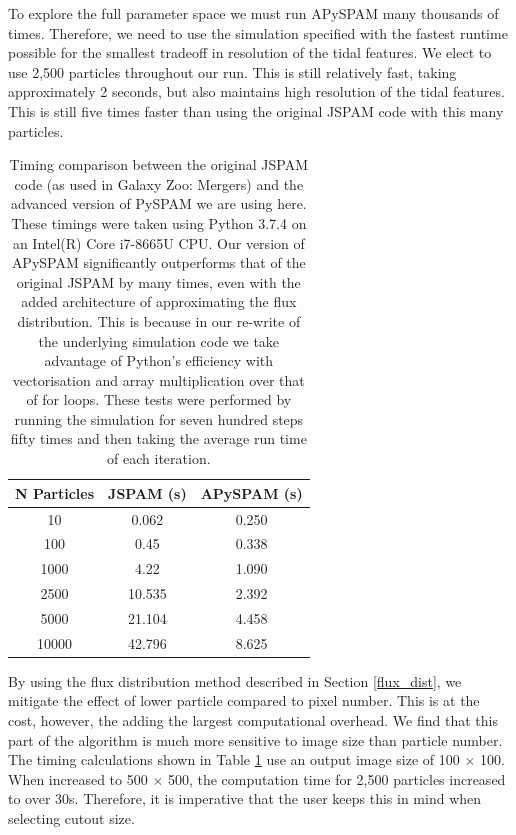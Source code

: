 To explore the full parameter space we must run APySPAM many thousands of times. Therefore, we need to use the simulation specified with the fastest runtime possible for the smallest tradeoff in resolution of the tidal features. We elect to use 2,500 particles throughout our run. This is still relatively fast, taking approximately 2 seconds, but also maintains high resolution of the tidal features. This is still five times faster than using the original JSPAM code with this many particles. 

\begin{table}
    \centering
    \begin{tabular}{|c|c|c|}
    \hline
        N Particles & JSPAM (s) & APySPAM (s)  \\
        \hline
        10 & 0.062 & 0.250 \\
        100 & 0.45 &  0.338 \\
        1000 & 4.22 & 1.090 \\
        2500 & 10.535 & 2.392 \\
        5000 & 21.104 & 4.458 \\
        10000 & 42.796 & 8.625 \\
        \hline
    \end{tabular}
    \caption{Timing comparison between the original JSPAM code (as used in Galaxy Zoo: Mergers) and the advanced version of PySPAM we are using here. These timings were taken using Python 3.7.4 on an Intel(R) Core i7-8665U CPU. Our version of APySPAM significantly outperforms that of the original JSPAM by many times, even with the added architecture of approximating the flux distribution. This is because in our re-write of the underlying simulation code we take advantage of Python's efficiency with vectorisation and array multiplication over that of for loops. These tests were performed by running the simulation for seven hundred steps fifty times and then taking the average run time of each iteration.}
    \label{tab:timings}
\end{table}

By using the flux distribution method described in Section \ref{flux_dist}, we mitigate the effect of lower particle compared to pixel number. This is at the cost, however, the adding the largest computational overhead. We find that this part of the algorithm is much more sensitive to image size than particle number. The timing calculations shown in Table \ref{tab:timings} use an output image size of 100 $\times$ 100. When increased to 500 $\times$ 500, the computation time for 2,500 particles increased to over 30s. Therefore, it is imperative that the user keeps this in mind when selecting cutout size.

